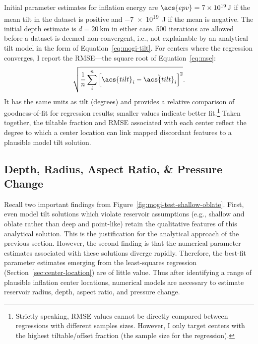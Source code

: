 Initial parameter estimates for inflation energy are $\acs{epv} = \qty{7e19}{\J}$ if the mean tilt in the dataset is positive and \qty{-7e19}{\J} if the mean is negative. The initial depth estimate is $d = \qty{20}{\km}$ in either case. 500 iterations are allowed before a dataset is deemed non-convergent, i.e., not explainable by an analytical tilt model in the form of Equation~\eqref{eq:mogi-tilt}. For centers where the regression converges, I report the \ac{RMSE}---the square root of Equation~\eqref{eq:mse}:
\begin{equation}
    \sqrt{\frac{1}{n}\sum_{i}^{n}{\left[\acs{tilt}_i-\hat{\acs{tilt}}_i\right]}^2}.\label{eq:rmse}
\end{equation}
It has the same units as \acs{tilt} (degrees) and provides a relative comparison of goodness-of-fit for regression results; smaller values indicate better fit.\footnote{Strictly speaking, \acs{RMSE} values cannot be directly compared between regressions with different samples sizes. However, I only target centers with the highest tiltable/offset fraction (the sample size for the regression).} Taken together, the tiltable fraction and \ac{RMSE} associated with each center reflect the degree to which a center location can link mapped discordant features to a plausible model tilt solution.

\subsection{Depth, Radius, Aspect Ratio, \& Pressure Change}

Recall two important findings from Figure~\ref{fig:mogi-test-shallow-oblate}. First, even model tilt solutions which violate \textcite{mogi_relations_1958} reservoir assumptions (e.g., shallow and oblate rather than deep and point-like) retain the qualitative features of this analytical solution. This is the justification for the analytical approach of the previous section. However, the second finding is that the numerical parameter estimates associated with these solutions diverge rapidly. Therefore, the best-fit parameter estimates emerging from the least-squares regression (Section~\ref{sec:center-location}) are of little value. Thus after identifying a range of plausible inflation center locations, numerical models are necessary to estimate reservoir radius, depth, aspect ratio, and pressure change.

